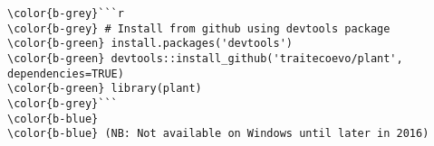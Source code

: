 \documentclass[class=minimal,border=0]{standalone}
\begin{document}
%
\begin{BVerbatim}
\color{b-grey}```r
\color{b-grey} # Install from github using devtools package
\color{b-green} install.packages('devtools')
\color{b-green} devtools::install_github('traitecoevo/plant', dependencies=TRUE)
\color{b-green} library(plant)
\color{b-grey}```
\color{b-blue}
\color{b-blue} (NB: Not available on Windows until later in 2016)
\end{BVerbatim}
\end{document}

